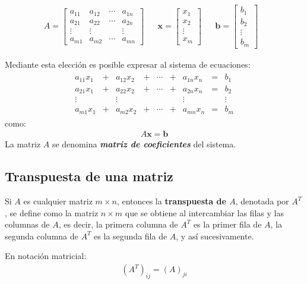 \documentclass[a4paper,12pt]{article}
\begin{document}
\begin{align*}
  A = \begin{bmatrix}
    a_{11}& a_{12}& \cdots& a_{1n}\\
    a_{21}& a_{22}& \cdots& a_{2n}\\
    \vdots&\vdots &       &\vdots \\
    a_{m1}& a_{m2}& \cdots& a_{mn}
  \end{bmatrix} &
  & \textbf{x} = \begin{bmatrix}
    x_1    \\
    x_2    \\
    \vdots \\
    x_m
  \end{bmatrix} &
  & \textbf{b} = \begin{bmatrix}
    b_1    \\
    b_2    \\
    \vdots \\
    b_m
  \end{bmatrix} &
\end{align*}

Mediante esta elección es posible expresar al sistema de ecuaciones:
\begin{align*}
  \begin{matrix}
    a_{11}x_1 &+& a_{12}x_2 &+& \cdots &+& a_{1n}x_n &=& b_1     \\
    a_{21}x_1 &+& a_{22}x_2 &+& \cdots &+& a_{2n}x_n &=& b_2     \\
    \vdots    & &\vdots     & &        & &\vdots     & & \vdots\\
    a_{m1}x_1 &+& a_{m2}x_2 &+& \cdots &+& a_{mn}x_n &=& b_m
  \end{matrix}
\end{align*}
como:
\begin{align*}
  A\textbf{x}=\textbf{b}
\end{align*}
La matriz $A$ se denomina \textbf{\emph{matriz de coeficientes}} del sistema.


\subsection{Transpuesta de una matriz}

\begin{concept}[i]
  Si $A$ es cualquier matriz $m\times n$, entonces la \textbf{transpuesta de
    $A$}, denotada por $A^T$, se define como la matriz $n\times m$ que se
    obtiene al intercambiar las filas y las columnas de $A$, es decir, la
    primera columna de $A^T$ es la primer fila de $A$, la segunda columna de
    $A^T$ es la segunda fila de $A$, y así sucesivamente.
\end{concept}
En notación matricial:
\begin{align*}
  \left( A^T \right)_{ij} = (A)_{ji}
\end{align*}
\end{document}
